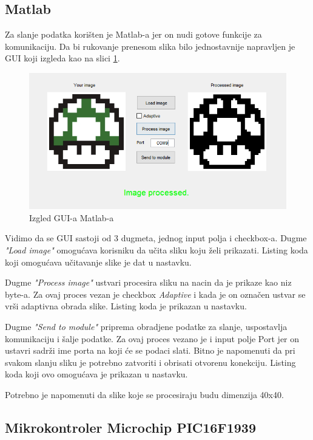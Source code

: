 \documentclass[12pt]{article}
\begin{document}
\subsection{Matlab}

Za slanje podatka korišten je Matlab-a jer on nudi gotove funkcije za komunikaciju. Da bi rukovanje prenesom slika bilo jednostavnije napravljen je GUI koji izgleda kao na slici \ref{fig:gui}.
\begin{figure}[h!]
    \centering
  \includegraphics[scale=0.55]{izgledGUIa.png}
  \caption{Izgled GUI-a Matlab-a}
  \label{fig:gui}
\end{figure}
Vidimo da se GUI sastoji od 3 dugmeta, jednog input polja i checkbox-a.\newline
Dugme \textit{"Load image"} omogućava korisniku da učita sliku koju želi prikazati. Listing koda koji omogućava učitavanje slike je dat u nastavku.



Dugme \textit{"Process image"} ustvari procesira sliku na nacin da je prikaze kao niz byte-a. Za ovaj proces vezan je checkbox \textit{Adaptive} i kada je on označen ustvar se vrši adaptivna obrada slike. Listing koda je prikazan u nastavku.

Dugme \textit{"Send to module"} priprema obradjene podatke za slanje, uspostavlja komunikaciju i šalje podatke. Za ovaj proces vezano je i input polje Port jer on ustavri sadrži ime porta na koji će se podaci slati. Bitno je napomenuti da pri svakom slanju sliku je potrebno zatvoriti i obrisati otvorenu konekciju. Listing koda koji ovo omogućava je prikazan u nastavku.

Potrebno je napomenuti da slike koje se procesiraju budu dimenzija 40x40.
\subsection{Mikrokontroler Microchip PIC16F1939}
\end{document}
